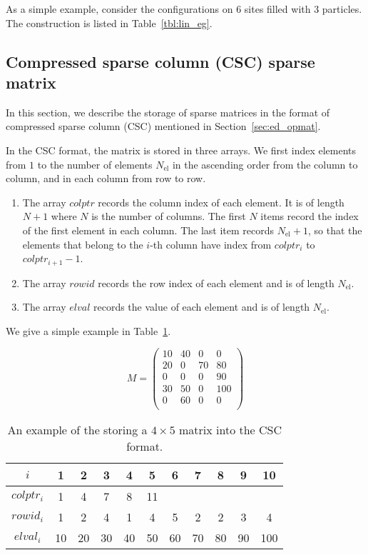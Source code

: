 \documentclass{timesjhep}
\begin{document}
As a simple example, consider the configurations on 6 sites filled with 3 particles. The construction is listed in Table~\ref{tbl:lin_eg}.

\FloatBarrier

\subsection{Compressed sparse column (CSC) sparse matrix} 
\label{app:data_csc}

In this section, we describe the storage of sparse matrices in the format of compressed sparse column (CSC) mentioned in Section~\ref{sec:ed_opmat}. 

In the CSC format, the matrix is stored in three arrays. We first index elements from $1$ to the number of elements $N_\mathrm{el}$ in the ascending order from the column to column, and in each column from row to row. 
\begin{enumerate}
    \item The array $colptr$ records the column index of each element. It is of length $N+1$ where $N$ is the number of columns. The first $N$ items record the index of the first element in each column. The last item records $N_\mathrm{el}+1$, so that the elements that belong to the $i$-th column have index from $colptr_i$ to $colptr_{i+1}-1$.
    \item The array $rowid$ records the row index of each element and is of length $N_\mathrm{el}$.
    \item The array $elval$ records the value of each element and is of length $N_\mathrm{el}$.
\end{enumerate}
We give a simple example in Table~\ref{tbl:csc_eg}.

\begin{table}[htbp]
    \centering
    \begin{equation*}
        M=\begin{pmatrix}
            10&40&0&0\\
            20&0&70&80\\
            0&0&0&90\\
            30&50&0&100\\
            0&60&0&0\\
        \end{pmatrix}
    \end{equation*}
    \begin{tabular}{c|cccccccccc}
        \hline\hline
        $i$&1&2&3&4&5&6&7&8&9&10\\
        \hline
        $colptr_i$&1&4&7&8&11\\
        $rowid_i$&1&2&4&1&4&5&2&2&3&4\\
        $elval_i$&10&20&30&40&50&60&70&80&90&100\\
        \hline\hline
    \end{tabular}
    \caption{An example of the storing a $4\times 5$ matrix into the CSC format. }
    \label{tbl:csc_eg}
\end{table}
\end{document}
